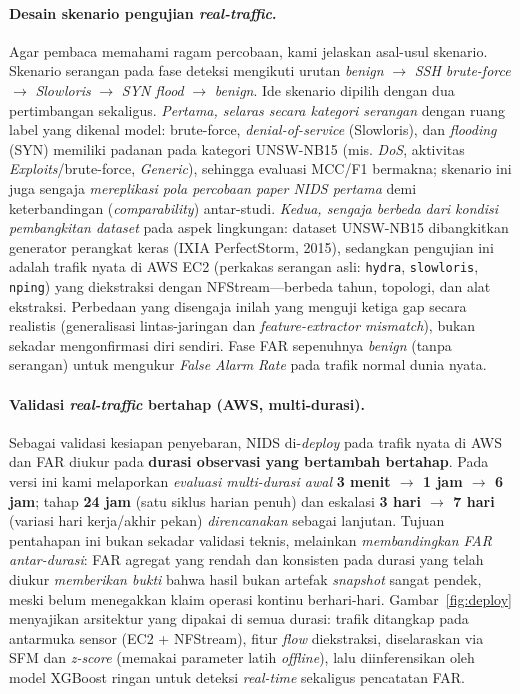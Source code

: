 \documentclass[11pt,a4paper]{article}
\begin{document}
\paragraph{Desain skenario pengujian \emph{real-traffic}.} Agar pembaca memahami
ragam percobaan, kami jelaskan asal-usul skenario. Skenario serangan pada fase
deteksi mengikuti urutan \emph{benign} $\rightarrow$ \emph{SSH brute-force}
$\rightarrow$ \emph{Slowloris} $\rightarrow$ \emph{SYN flood} $\rightarrow$
\emph{benign}. Ide skenario dipilih dengan dua pertimbangan sekaligus.
\emph{Pertama, selaras secara kategori serangan} dengan ruang label yang dikenal
model: brute-force, \emph{denial-of-service} (Slowloris), dan \emph{flooding}
(SYN) memiliki padanan pada kategori UNSW-NB15 (mis. \emph{DoS}, aktivitas
\emph{Exploits}/brute-force, \emph{Generic}), sehingga evaluasi MCC/F1 bermakna;
skenario ini juga sengaja \emph{mereplikasi pola percobaan paper NIDS pertama}
demi keterbandingan (\emph{comparability}) antar-studi. \emph{Kedua, sengaja
berbeda dari kondisi pembangkitan dataset} pada aspek lingkungan: dataset
UNSW-NB15 dibangkitkan generator perangkat keras (IXIA PerfectStorm, 2015),
sedangkan pengujian ini adalah trafik nyata di AWS EC2 (perkakas serangan asli:
\texttt{hydra}, \texttt{slowloris}, \texttt{nping}) yang diekstraksi dengan
NFStream---berbeda tahun, topologi, dan alat ekstraksi. Perbedaan yang disengaja
inilah yang menguji ketiga gap secara realistis (generalisasi lintas-jaringan
dan \emph{feature-extractor mismatch}), bukan sekadar mengonfirmasi diri sendiri.
Fase FAR sepenuhnya \emph{benign} (tanpa serangan) untuk mengukur \emph{False
Alarm Rate} pada trafik normal dunia nyata.

\paragraph{Validasi \emph{real-traffic} bertahap (AWS, multi-durasi).} Sebagai
validasi kesiapan penyebaran, NIDS di-\emph{deploy} pada trafik nyata di AWS dan
FAR diukur pada \textbf{durasi observasi yang bertambah bertahap}. Pada versi ini
kami melaporkan \emph{evaluasi multi-durasi awal}
\textbf{3 menit $\rightarrow$ 1 jam $\rightarrow$ 6 jam}; tahap \textbf{24 jam}
(satu siklus harian penuh) dan eskalasi \textbf{3 hari $\rightarrow$ 7 hari}
(variasi hari kerja/akhir pekan) \emph{direncanakan} sebagai lanjutan. Tujuan
pentahapan ini bukan sekadar validasi teknis, melainkan \emph{membandingkan FAR
antar-durasi}: FAR agregat yang rendah dan konsisten pada durasi yang telah diukur
\emph{memberikan bukti} bahwa hasil bukan artefak \emph{snapshot} sangat pendek,
meski belum menegakkan klaim operasi kontinu berhari-hari. Gambar~\ref{fig:deploy} menyajikan arsitektur yang
dipakai di semua durasi: trafik ditangkap pada antarmuka sensor (EC2 + NFStream),
fitur \emph{flow} diekstraksi, diselaraskan via SFM dan \emph{z-score} (memakai
parameter latih \emph{offline}), lalu diinferensikan oleh model XGBoost ringan
untuk deteksi \emph{real-time} sekaligus pencatatan FAR.
\end{document}

